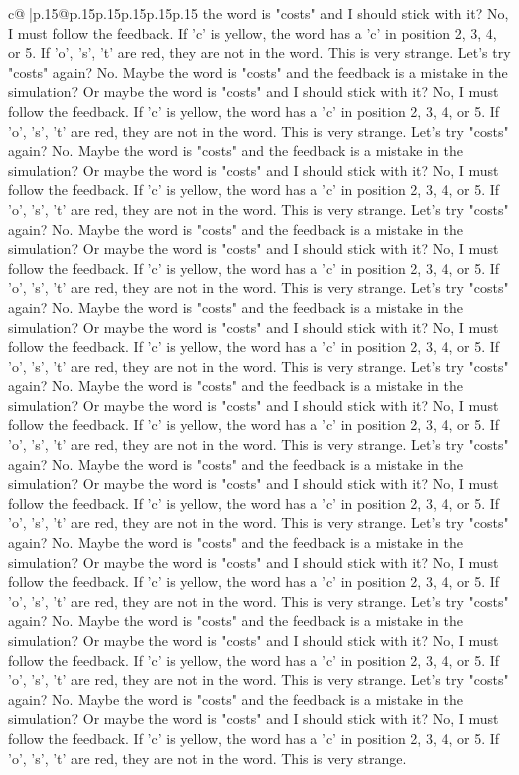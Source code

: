\documentclass{article}
\begin{document}
{\begin{supertabular}{c@{$\;$}|p{.15\linewidth}@{}p{.15\linewidth}p{.15\linewidth}p{.15\linewidth}p{.15\linewidth}p{.15\linewidth}}
{{{the word is "costs" and I should stick with it? No, I must follow the feedback. If 'c' is yellow, the word has a 'c' in position 2, 3, 4, or 5. If 'o', 's', 't' are red, they are not in the word. This is very strange. Let's try "costs" again? No. Maybe the word is "costs" and the feedback is a mistake in the simulation? Or maybe the word is "costs" and I should stick with it? No, I must follow the feedback. If 'c' is yellow, the word has a 'c' in position 2, 3, 4, or 5. If 'o', 's', 't' are red, they are not in the word. This is very strange. Let's try "costs" again? No. Maybe the word is "costs" and the feedback is a mistake in the simulation? Or maybe the word is "costs" and I should stick with it? No, I must follow the feedback. If 'c' is yellow, the word has a 'c' in position 2, 3, 4, or 5. If 'o', 's', 't' are red, they are not in the word. This is very strange. Let's try "costs" again? No. Maybe the word is "costs" and the feedback is a mistake in the simulation? Or maybe the word is "costs" and I should stick with it? No, I must follow the feedback. If 'c' is yellow, the word has a 'c' in position 2, 3, 4, or 5. If 'o', 's', 't' are red, they are not in the word. This is very strange. Let's try "costs" again? No. Maybe the word is "costs" and the feedback is a mistake in the simulation? Or maybe the word is "costs" and I should stick with it? No, I must follow the feedback. If 'c' is yellow, the word has a 'c' in position 2, 3, 4, or 5. If 'o', 's', 't' are red, they are not in the word. This is very strange. Let's try "costs" again? No. Maybe the word is "costs" and the feedback is a mistake in the simulation? Or maybe the word is "costs" and I should stick with it? No, I must follow the feedback. If 'c' is yellow, the word has a 'c' in position 2, 3, 4, or 5. If 'o', 's', 't' are red, they are not in the word. This is very strange. Let's try "costs" again? No. Maybe the word is "costs" and the feedback is a mistake in the simulation? Or maybe the word is "costs" and I should stick with it? No, I must follow the feedback. If 'c' is yellow, the word has a 'c' in position 2, 3, 4, or 5. If 'o', 's', 't' are red, they are not in the word. This is very strange. Let's try "costs" again? No. Maybe the word is "costs" and the feedback is a mistake in the simulation? Or maybe the word is "costs" and I should stick with it? No, I must follow the feedback. If 'c' is yellow, the word has a 'c' in position 2, 3, 4, or 5. If 'o', 's', 't' are red, they are not in the word. This is very strange. Let's try "costs" again? No. Maybe the word is "costs" and the feedback is a mistake in the simulation? Or maybe the word is "costs" and I should stick with it? No, I must follow the feedback. If 'c' is yellow, the word has a 'c' in position 2, 3, 4, or 5. If 'o', 's', 't' are red, they are not in the word. This is very strange. Let's try "costs" again? No. Maybe the word is "costs" and the feedback is a mistake in the simulation? Or maybe the word is "costs" and I should stick with it? No, I must follow the feedback. If 'c' is yellow, the word has a 'c' in position 2, 3, 4, or 5. If 'o', 's', 't' are red, they are not in the word. This is very strange. }}}
\end{supertabular}}
\end{document}
